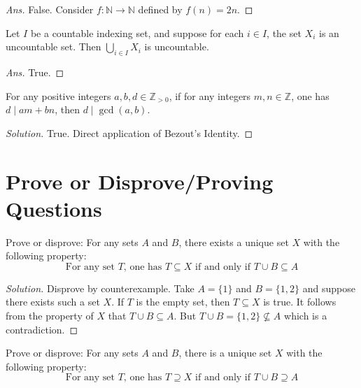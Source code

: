 \documentclass[12pt]{article}
\newenvironment{problem}[2][Problem]{\begin{trivlist}
\item[\hskip \labelsep {\bfseries #1}\hskip \labelsep {\bfseries #2.}]}{\end{trivlist}}
\begin{document}
\begin{proof}[Ans]
False. Consider $f : \mathbb{N} \to \mathbb{N}$ defined by $f(n) = 2n$.
\end{proof}

\begin{problem}{59}
Let $I$ be a countable indexing set, and suppose for each $i \in I$, the set $X_i$ is an uncountable set. Then $\bigcup_{i \in I} X_i$ is uncountable.
\end{problem}

\begin{proof}[Ans]
True.
\end{proof}

\begin{problem}{60}
For any positive integers $a, b, d \in \mathbb{Z}_{>0}$, if for any integers $m,n \in \mathbb{Z}$, one has $d \mid am+ bn$, then $d \mid \gcd(a, b)$.
\end{problem}

\begin{proof}[Solution]
True. Direct application of Bezout's Identity.
\end{proof}
\newpage

\section{Prove or Disprove/Proving Questions}

\begin{problem}{1}[10 points] Prove or disprove: For any sets $A$ and $B$, there exists a unique set $X$ with the following property:
\[\text{For any set }T\text{, one has  } T \subseteq X \text{  if and only if   } T \cup B \subseteq A\]

\end{problem}

\begin{proof}[Solution] Disprove by counterexample. Take $A = \{1\}$ and $B = \{1, 2\}$ and suppose there exists such a set $X$. If $T$ is the empty set, then $T \subseteq X$ is true. It follows from the property of $X$ that $T \cup B \subseteq A$. But $T \cup B = \{1, 2\} \not\subseteq A$ which is a contradiction.
\end{proof}

\newpage

\begin{problem}{2}[10 points] Prove or disprove: For any sets $A$ and $B$, there is a unique set $X$ with the following property:
\[\text{For any set }T\text{,  one has  } T\supseteq X \text{   if and only if  } T\cup B \supseteq A\]

\end{problem}
\end{document}
